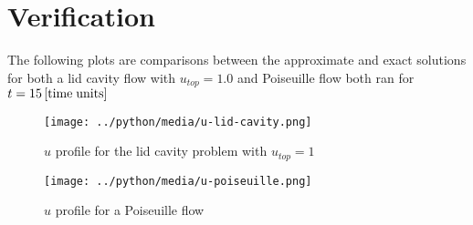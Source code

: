 \section{Verification}
The following plots are comparisons between the approximate and exact
solutions for both a lid cavity flow with $u_{top} = 1.0$ and 
Poiseuille flow both ran for $t=\SI{15}{\left[time\;units\right]}$
\begin{figure}[H]
    \texttt{[image: ../python/media/u-lid-cavity.png]}
    \caption{$u$ profile for the lid cavity problem with $u_{top} =1$}
\end{figure}
\begin{figure}[H]
    \texttt{[image: ../python/media/u-poiseuille.png]}
    \caption{$u$ profile for a Poiseuille flow}
\end{figure}
\vfill
